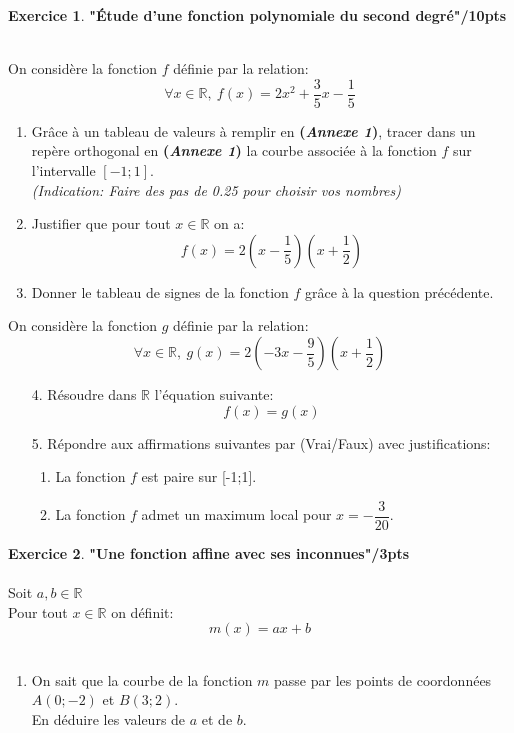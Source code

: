 \documentclass[a4paper,10.9pt]{article}
\theoremstyle{definition}
\newtheorem{exo}{Exercice}
\newcommand{\R}{\mathbb{R}}
\begin{document}
\begin{exo} \textbf{"Étude d'une fonction polynomiale du second degré"}\hfill\textbf{/10pts}\\\hfil\\

\begin{minipage}[t]{1.0\linewidth}
 \noindent On considère la fonction $f$ définie par la relation:
 $$\forall x\in \R,\ f(x) = 2x^2 +\dfrac{3}{5}x- \dfrac{1}{5}$$
\begin{enumerate}
\item Grâce à un tableau de valeurs à remplir en \textbf{(\textit{Annexe 1})}, tracer dans un repère orthogonal en \textbf{(\textit{Annexe 1})} la courbe associée à la fonction $f$ sur l’intervalle $[-1;1]$.\\
\textit{(Indication: Faire des pas de 0.25 pour choisir vos nombres)}
\item Justifier que pour tout $x\in\R$ on a: $$f(x)= 2(x-\dfrac{1}{5})(x+\dfrac{1}{2})$$
\item Donner le tableau de signes de la fonction $f$ grâce à la question précédente.\\
\end{enumerate}
\noindent On considère la fonction $g$ définie par la relation:
$$\forall x\in \R,\ g(x) = 2(-3x-\dfrac{9}{5})(x+\dfrac{1}{2})$$
\begin{enumerate}
	\item[4.] Résoudre dans $\R$ l'équation suivante: 
	$$f(x) = g(x) $$
	\item[5.] Répondre aux affirmations suivantes par (Vrai/Faux) avec justifications:
	\begin{enumerate}
		\item La fonction $f$ est paire sur [-1;1].
		\item La fonction $f$ admet un maximum local pour $x= -\dfrac{3}{20}$.
	\end{enumerate}
\end{enumerate}
\end{minipage}

\end{exo}

\begin{exo} \textbf{"Une fonction affine avec ses inconnues"}\hfill\textbf{/3pts}\\\hfil\\
Soit $a,b \in \R$ \\
Pour tout  $x\in\R$ on définit: $$m(x) = ax + b $$ \hfill\\[-0.2cm]
\begin{enumerate}[$\square$]
	\item On sait que la courbe de la fonction $m$ passe par les points de coordonnées $A(0;-2)$ et $B(3;2)$. \\[0.2cm] En déduire les valeurs de $a$ et de $b$.\\ 
	
\end{enumerate}
\end{exo}
\end{document}
